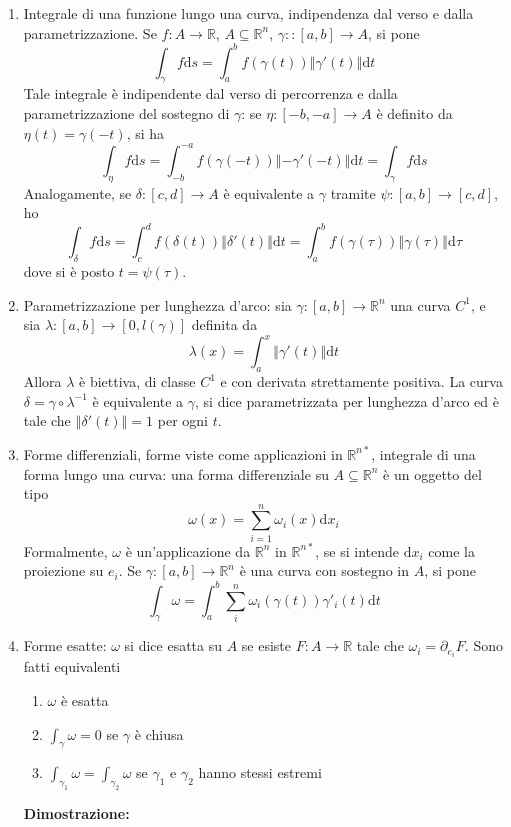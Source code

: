 \documentclass[a4paper,11pt]{article}
\newcommand{\norm}[1]{\left\Vert#1\right\Vert}
\begin{document}
\begin{enumerate}
	\item Integrale di una funzione lungo una curva, indipendenza dal verso e dalla parametrizzazione. Se $f\colon A\to\mathbb{R}$, $A\subseteq\mathbb{R}^n$, $\gamma:\colon[a,b]\to A$, si pone
	\[\int_{\gamma}f\mathrm{d}s=\int_{a}^{b}f(\gamma(t))\norm{\gamma'(t)}\mathrm{d}t\]
	Tale integrale è indipendente dal verso di percorrenza e dalla parametrizzazione del sostegno di $\gamma$: se $\eta\colon[-b,-a]\to A$ è definito da $\eta(t)=\gamma(-t)$, si ha 
	\[\int_{\eta}f\mathrm{d}s=\int_{-b}^{-a}f(\gamma(-t))\norm{-\gamma'(-t)}\mathrm{d}t=\int_{\gamma}f\mathrm{d}s\]
	Analogamente, se $\delta:[c,d]\to A$ è equivalente a $\gamma$ tramite $\psi\colon[a,b]\to[c,d]$, ho
	\[\int_{\delta}f\mathrm{d}s=\int_{c}^{d}f(\delta(t))\norm{\delta'(t)}\mathrm{d}t=\int_{a}^{b}f(\gamma(\tau))\norm{\gamma(\tau)}\mathrm{d}\tau\]
	dove si è posto $t=\psi(\tau)$.
	\item Parametrizzazione per lunghezza d'arco: sia $\gamma\colon[a,b]\to\mathbb{R}^n$ una curva $C^1$, e sia $\lambda\colon[a,b]\to[0,l(\gamma)]$ definita da
	\[\lambda(x)=\int_{a}^{x}\norm{\gamma'(t)}\mathrm{d}t\]
	Allora $\lambda$ è biettiva, di classe $C^1$ e con derivata strettamente positiva. La curva $\delta=\gamma\circ\lambda^{-1}$ è equivalente a $\gamma$, si dice parametrizzata per lunghezza d'arco ed è tale che $\norm{\delta'(t)}=1$ per ogni $t$.
	\item Forme differenziali, forme viste come applicazioni in $\mathbb{R}^{n*}$, integrale di una forma lungo una curva: una forma differenziale su $A\subseteq\mathbb{R}^n$ è un oggetto del tipo
	\[\omega(x)=\sum_{i=1}^{n}\omega_i(x)\mathrm{d}x_i\]
	Formalmente, $\omega$ è un'applicazione da $\mathbb{R}^n$ in $\mathbb{R}^{n*}$, se si intende $\mathrm{d}x_i$ come la proiezione su $e_i$. Se $\gamma\colon[a,b]\to\mathbb{R}^n$ è una curva con sostegno in $A$, si pone
	\[\int_{\gamma}\omega=\int_{a}^{b}\sum_{i}^{n}\omega_i(\gamma(t))\gamma'_i(t)\mathrm{d}t\]
	\item Forme esatte: $\omega$ si dice esatta su $A$ se esiste $F\colon A\to\mathbb{R}$ tale che $\omega_i=\partial_{e_i}F$. Sono fatti equivalenti
	\begin{enumerate}
		\item $\omega$ è esatta
		\item $\int_{\gamma}\omega=0$ se $\gamma$ è chiusa
		\item $\int_{\gamma_1}\omega=\int_{\gamma_2}\omega$ se $\gamma_1$ e $\gamma_2$ hanno stessi estremi
	\end{enumerate}
	\textbf{Dimostrazione:} 
	

\end{enumerate}
\end{document}

